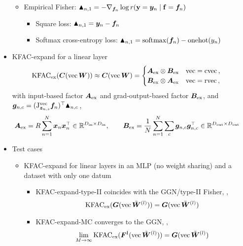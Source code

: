 \begin{itemize}
\begin{itemize}
    \item Empirical Fisher: $\blacktriangle_{n,1} = - \nabla_{{\bm{f}}_n} \log r({\mathbf{y}} = {\bm{y}}_n \mid {\mathbf{f}} = {\bm{f}}_n)$
      \begin{itemize}
      \item Square loss: $\blacktriangle_{n,1} = {\bm{y}}_n - {\bm{f}}_n$
      \item Softmax cross-entropy loss: $\blacktriangle_{n,1} = \mathrm{softmax}({\bm{f}}_n) - \mathrm{onehot}(y_n)$
      \end{itemize}
    \end{itemize}
  \item KFAC-expand for a linear layer
    \begin{align*}
      &\mathrm{KFAC}_{\text{ex}}({\bm{C}}(\operatorname{vec} {\bm{W}})) \approx {\bm{C}}(\operatorname{vec} {\bm{W}})
      =
        \begin{cases}
          {\bm{A}}_{\text{ex}} \otimes {\bm{B}}_{\text{ex}} & \operatorname{vec} = \operatorname{cvec}\,,
          \\
          {\bm{B}}_{\text{ex}} \otimes {\bm{A}}_{\text{ex}} & \operatorname{vec} = \operatorname{rvec}\,,
        \end{cases}\,
    \end{align*}
    with input-based factor ${\bm{A}}_{\text{ex}}$ and grad-output-based factor ${\bm{B}}_{\text{ex}}$, and ${\bm{g}}_{n,c} = (\mathrm{J}_{{\bm{z}}_{n,s}}^{\operatorname{vec}}{\bm{f}}_n)^{\top} \blacktriangle_{n,c}\,$,
    \begin{align*}
      {\bm{A}}_{\text{ex}} = R \sum_{n=1}^N {\bm{x}}_{n} {\bm{x}}_{n}^{\top} \in {\mathbb{R}}^{D_{\text{in}} \times D_{\text{in}}}, \qquad
      {\bm{B}}_{\text{ex}} &= \frac{1}{N}\sum_{n=1}^N \sum_c {\bm{g}}_{n,c} {\bm{g}}_{n,c}^{\top}  \in {\mathbb{R}}^{D_{\text{out}} \times D_{\text{out}}}
    \end{align*}
  \item Test cases
    \begin{itemize}
      \item KFAC-expand for linear layers in an MLP (no weight sharing) and a dataset with only one datum
        \begin{itemize}
          \item KFAC-expand-type-II coincides with the GGN/type-II Fisher, \ie,
            \begin{align*}
              \mathrm{KFAC}_{\text{ex}}({\bm{G}}(\operatorname{vec}\tilde{{\bm{W}}}^{(l)})) = {\bm{G}}(\operatorname{vec} \tilde{{\bm{W}}}^{(l)})
            \end{align*}
          \item KFAC-expand-MC converges to the GGN, \ie,
            \begin{align*}
              \lim_{M \to \infty} \kfac_{\text{ex}}(\mF^{\text{I}}(\vec\tilde{\mW}^{(l)})) = \mG(\vec \tilde{\mW}^{(l)})

\end{align*}
\end{itemize}
\end{itemize}
\end{itemize}
